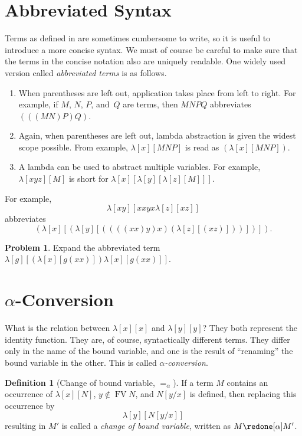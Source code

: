 \documentclass[10pt,a4paper]{article}
\makeatletter
\theoremstyle{plain}
\theoremstyle{definition}
\newtheorem{defn}[thm]{Definition}
\newtheorem{prob}{Problem}[section]
\theoremstyle{remark}
\newcommand*{\olfileid}[3]{}
\newcommand*{\olsection}[1]{\section*{#1}}
\newcommand{\olref}{\@ifnextchar[{\olref@i}{\olref@final}}
\def\olref@i[#1]{\@ifnextchar[{\olref@ii}{\olref@final}}
\def\olref@ii[#1]{\@ifnextchar[{\olref@iii}{\olref@final}}
\def\olref@iii[#1]{\olref@final}
\def\olref@final#1{\ref{#1}}
\providecommand{\Subst}[3]{#1[#2/#3]}
\providecommand{\lambd}{\ensuremath{\lambda}}
\providecommand{\FV}{\operatorname{FV}}
\providecommand{\aconvone}{\mathrel{=_\alpha}}
\providecommand{\FV}{\operatorname{FV}}
\makeatother
\begin{document}



\olfileid{lam}{syn}{abb}
\olsection{Abbreviated Syntax}

Terms as defined in \olref[trm]{defn:term} are sometimes cumbersome to
write, so it is useful to introduce a more concise syntax. We must of
course be careful to make sure that the terms in the concise notation
also are uniquely readable.  One widely used version called
\emph{abbreviated terms} is as follows.

\begin{enumerate}
\item When parentheses are left out, application takes place from left
  to right. For example, if $M$, $N$, $P$, and~$Q$ are terms, then
  $MNPQ$ abbreviates $(((MN)P)Q)$.
\item Again, when parentheses are left out, lambda abstraction is
  given the widest scope possible. From example, $\lambd[x][MNP]$ is
  read as $(\lambd[x][MNP])$.
\item A lambda can be used to abstract multiple variables. For
  example, $\lambd[xyz][M]$ is short for
  $\lambd[x][\lambd[y][\lambd[z][M]]]$.
\end{enumerate}

For example,
\[
\lambd[xy][xxyx \lambd[z][xz]]
\]
abbreviates
\[
(\lambd[x][(\lambd[y][((((xx)y)x)(\lambd[z][(xz)]))])]).
\]

\begin{prob}
Expand the abbreviated term $\lambd[g][(\lambd[x][g (x x)])
  \lambd[x][g (x x)]]$.
\end{prob}





\olfileid{lam}{syn}{alp}
\olsection{$\alpha$-Conversion}

What is the relation between $\lambd[x][x]$ and $\lambd[y][y]$? They
both represent the identity function. They are, of course,
syntactically different terms. They differ only in the name of the
bound variable, and one is the result of ``renaming'' the bound
variable in the other. This is called \emph{$\alpha$-conversion}.

\begin{defn}[Change of bound variable, $\aconvone$]
  If a term $M$ contains an occurrence of $\lambd[x][N]$, $y \notin
  \FV{N}$, and $\Subst{N}{y}{x}$ is defined, then replacing this occurrence
  by 
  \begin{equation*}
    \lambd[y][\Subst{N}{y}{x}]
  \end{equation*}
  resulting in $M'$ is called a \emph{change of bound variable}, written
  as $M \redone[\alpha] M'$.
\end{defn}
\end{document}
